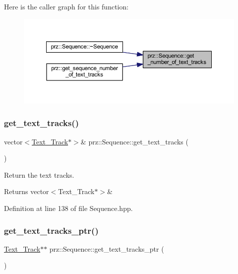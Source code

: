 Here is the caller graph for this function\+:
\nopagebreak
\begin{figure}[H]
\begin{center}
\leavevmode
\includegraphics[width=350pt]{classprz_1_1_sequence_a1f00232c23dda0a52686d2012b6990c5_icgraph}
\end{center}
\end{figure}
\mbox{\label{classprz_1_1_sequence_a7f39a3d45d20f4f65811d8603b90fa83}} 
\subsubsection{\texorpdfstring{get\_text\_tracks()}{get\_text\_tracks()}}
{\footnotesize\ttfamily vector$<$\mbox{\hyperlink{classprz_1_1_text___track}{Text\+\_\+\+Track}}$\ast$$>$\& prz\+::\+Sequence\+::get\+\_\+text\+\_\+tracks (\begin{DoxyParamCaption}{ }\end{DoxyParamCaption})\hspace{0.3cm}{\ttfamily [inline]}}



Return the text tracks. 

\begin{DoxyReturn}{Returns}
vector$<$\+Text\+\_\+\+Track$\ast$$>$\& 
\end{DoxyReturn}


Definition at line 138 of file Sequence.\+hpp.

\mbox{\label{classprz_1_1_sequence_af987ebf568d1a5ab5d589f9a0e7746c9}} 
\subsubsection{\texorpdfstring{get\_text\_tracks\_ptr()}{get\_text\_tracks\_ptr()}}
{\footnotesize\ttfamily \mbox{\hyperlink{classprz_1_1_text___track}{Text\+\_\+\+Track}}$\ast$$\ast$ prz\+::\+Sequence\+::get\+\_\+text\+\_\+tracks\+\_\+ptr (\begin{DoxyParamCaption}{ }\end{DoxyParamCaption})\hspace{0.3cm}{\ttfamily [inline]}}



